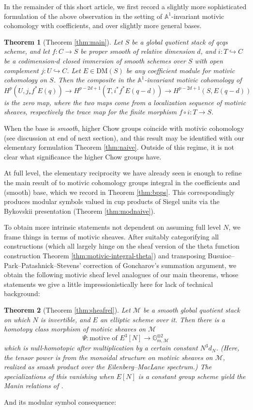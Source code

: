 \documentclass[a4paper,reqno,11pt]{amsart}
\theoremstyle{plain}
\newtheorem{theorem}{Theorem}[section]
\theoremstyle{definition}
\theoremstyle{remark}
\newcommand{\A}{\mathbb{A}}
\newcommand{\G}{\mathbb{G}}
\newcommand{\DM}{\mathrm{DM}}
\begin{document}
In the remainder of this short article, we first record a slightly more sophisticated formulation of the above observation in the setting of $\A^1$-invariant motivic cohomology with coefficients, and over slightly more general bases. 

\begin{theorem}[Theorem \ref{thm:main}]
    Let $S$ be a global quotient stack of qcqs scheme, and let $f:C\to S$ be proper smooth of relative dimension $d$, and $i:T\hookrightarrow C$ be a codimension-$d$ closed immersion of smooth schemes over $S$ with open complement $j:U\hookrightarrow C$. Let $E\in \DM(S)$ be any coefficient module for motivic cohomology on $S$. Then the composite in the $\A^1$-invariant motivic cohomology of \cite{BEM}
    \[
    H^p(U,j_*f^*E(q))\to H^{p-2d+1}(T,i^* f^*E(q-d))\to  H^{p-2d+1}(S,E(q-d))
    \]
    is the zero map, where the two maps come from a localization sequence of motivic sheaves, respectively the trace map for the finite morphism $f\circ i:T\to S$.
\end{theorem}

When the base is \emph{smooth}, higher Chow groups coincide with motivic cohomology (see discussion at end of next section), and this result may be identified with our elementary formulation Theorem \ref{thm:naive}. Outside of this regime, it is not clear what significance the higher Chow groups have.

At full level, the elementary reciprocity we have already seen is enough to refine the main result of \cite{BPPS} to motivic cohomology groups integral in the coefficients and (smooth) base, which we record in Theorem \ref{thm:bpps}. This correspondingly produces modular symbols valued in cup products of Siegel units via the Bykovskii presentation (Theorem \ref{thm:modnaive}). 

To obtain more intrinsic statements not dependent on assuming full level $N$, we frame things in terms of motivic sheaves. After suitably categorifying all constructions (which all largely hinge on the sheaf version of the theta function construction Theorem \ref{thm:motivic-integral-theta}) and transposing Busuioc--Park--Patashnick--Stevens' correction of Goncharov's summation argument, we obtain the following motivic sheaf level analogues of our main theorems, whose statements we give a little impressionistically here for lack of technical background:

\begin{theorem}[Theorem \ref{thm:sheafrel}]
    Let $\mathcal{M}$ be a smooth global quotient stack on which $N$ is invertible, and $E$ an elliptic scheme over it. Then there is a homotopy class morphism of motivic sheaves on $\mathcal{M}$
    \[
    \Psi: \text{motive of }E^3[N] \to \G_{m,\mathcal{M}}^{\otimes 2}
    \]
    which is null-homotopic after multiplication by a certain constant $N^3 d_N$. (Here, the tensor power is from the monoidal structure on motivic sheaves on $\mathcal{M}$, realized as smash product over the Eilenberg--MacLane spectrum.) The specializations of this vanishing when $E[N]$ is a constant group scheme yield the Manin relations of \cite{BPPS}.
\end{theorem}
And its modular symbol consequence:
\end{document}
